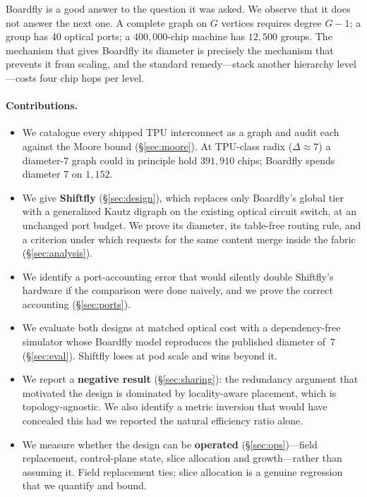 \documentclass[sigconf,nonacm]{acmart}
\theoremstyle{acmdefinition}%
\begin{document}
Boardfly is a good answer to the question it was asked. We observe that it does
not answer the next one. A complete graph on $G$ vertices requires degree
$G-1$; a group has $40$ optical ports; a $400{,}000$-chip machine has $12{,}500$
groups. The mechanism that gives Boardfly its diameter is precisely the
mechanism that prevents it from scaling, and the standard remedy---stack another
hierarchy level---costs four chip hops per level.

\paragraph{Contributions.}
\begin{itemize}
\item We catalogue every shipped TPU interconnect as a graph and audit each
against the Moore bound (\S\ref{sec:moore}). At TPU-class radix ($\Delta
\approx 7$) a diameter-$7$ graph could in principle hold $391{,}910$ chips;
Boardfly spends diameter $7$ on $1{,}152$.
\item We give \textbf{Shiftfly} (\S\ref{sec:design}), which replaces only
Boardfly's global tier with a generalized Kautz digraph on the existing optical
circuit switch, at an unchanged port budget. We prove its diameter, its
table-free routing rule, and a criterion under which requests for the same
content merge inside the fabric (\S\ref{sec:analysis}).
\item We identify a port-accounting error that would silently double Shiftfly's
hardware if the comparison were done naively, and we prove the correct
accounting (\S\ref{sec:ports}).
\item We evaluate both designs at matched optical cost with a dependency-free
simulator whose Boardfly model reproduces the published diameter of~$7$
(\S\ref{sec:eval}). Shiftfly loses at pod scale and wins beyond it.
\item We report a \textbf{negative result} (\S\ref{sec:sharing}): the redundancy
argument that motivated the design is dominated by locality-aware placement,
which is topology-agnostic. We also identify a metric inversion that would have
concealed this had we reported the natural efficiency ratio alone.
\item We measure whether the design can be \textbf{operated}
(\S\ref{sec:ops})---field replacement, control-plane state, slice allocation and
growth---rather than assuming it. Field replacement ties; slice allocation is a
genuine regression that we quantify and bound.
\end{itemize}
\end{document}
